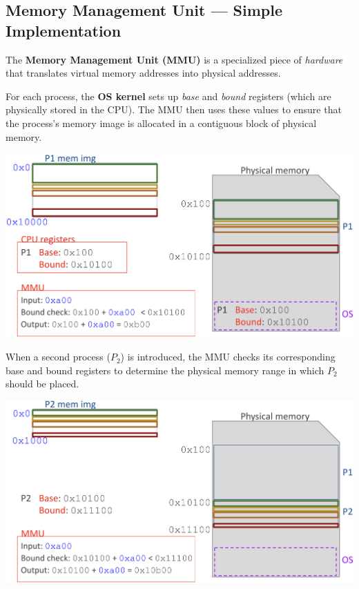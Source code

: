 \documentclass[../../compsys.tex]{subfiles}
\begin{document}
\subsection{Memory Management Unit --- Simple Implementation}
\vspace{10px}
\noindent The \textbf{Memory Management Unit (MMU)} is a specialized piece of \textit{hardware} that translates virtual memory addresses into physical addresses.\\[10px]
\vspace{10px}
\noindent
\begin{minipage}{0.45\textwidth}
  For each process, the \textbf{OS kernel} sets up \emph{base} and \emph{bound} registers (which are physically stored in the CPU). The MMU then uses these values to ensure that the process’s memory image is allocated in a contiguous block of physical memory.\\[10px]
\begin{center}
  \includegraphics[width=1.1\textwidth]{chapters/L4/images/indirection.png}
\end{center}
\end{minipage}%
\hfill
\vline
\hfill
\begin{minipage}{0.45\textwidth}
\noindent When a second process (\(P_2\)) is introduced, the MMU checks its corresponding base and bound registers to determine the physical memory range in which \(P_2\) should be placed.
\begin{center}
  \includegraphics[width=1.1\textwidth]{chapters/L4/images/indirection-P2.png}
\end{center}
\end{minipage}
\\[70px]
\end{document}
